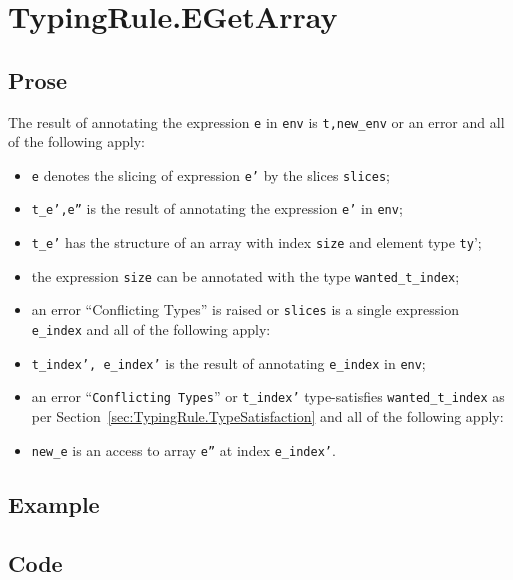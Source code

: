 \documentclass{book}
\begin{document}

\section{TypingRule.EGetArray \label{sec:TypingRule.EGetArray}}

  \subsection{Prose}
  The result of annotating the expression \texttt{e} in \texttt{env} is
\texttt{t,new\_env} or an error and all of the following apply:
  \begin{itemize}
  \item \texttt{e} denotes the slicing of expression \texttt{e'} by the slices \texttt{slices};
  \item \texttt{t\_e',e''} is the result of annotating the expression \texttt{e'} in \texttt{env};
  \item \texttt{t\_e'} has the structure of an array with index \texttt{size} and element type \texttt{ty}';
  \item the expression \texttt{size} can be annotated with the type \texttt{wanted\_t\_index};
  \item an error ``Conflicting Types'' is raised or \texttt{slices} is a single expression \texttt{e\_index} and all of the following apply:
  \item \texttt{t\_index', e\_index'} is the result of annotating \texttt{e\_index} in \texttt{env};
  \item an error ``\texttt{Conflicting Types}'' or \texttt{t\_index'} type-satisfies \texttt{wanted\_t\_index} as per Section~\ref{sec:TypingRule.TypeSatisfaction} and all of the following apply:
  \item \texttt{new\_e} is an access to array \texttt{e''} at index \texttt{e\_index'}.
  \end{itemize}

  \subsection{Example}

  \subsection{Code}
\end{document}
